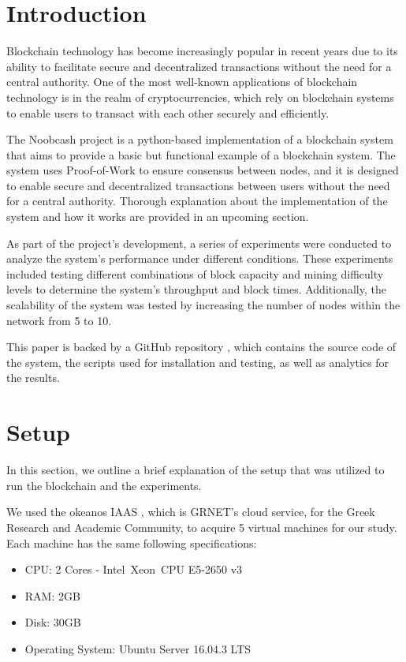 \documentclass[conference]{IEEEtran}
\begin{document}
\section{\textbf{Introduction}}
Blockchain technology has become increasingly popular in recent years due to its ability to facilitate secure and decentralized transactions without the need for a central authority. One of the most well-known applications of blockchain technology is in the realm of cryptocurrencies, which rely on blockchain systems to enable users to transact with each other securely and efficiently. 

The Noobcash project is a python-based implementation of a blockchain system that aims to provide a basic but functional example of a blockchain system. The system uses Proof-of-Work to ensure consensus between nodes, and it is designed to enable secure and decentralized transactions between users without the need for a central authority. Thorough explanation about the implementation of the system and how it works are provided in an upcoming section.

As part of the project's development, a series of experiments were conducted to analyze the system's performance under different conditions. These experiments included testing different combinations of block capacity and mining difficulty levels to determine the system's throughput and block times. Additionally, the scalability of the system was tested by increasing the number of nodes within the network from 5 to 10.

This paper is backed by a GitHub repository \cite{b5} \cite{b6}, which contains the source code of the system, the scripts used for installation and testing, as well as analytics for the results.

\section{\textbf{Setup}}
In this section, we outline a brief explanation of the setup that was utilized to run the blockchain and the experiments.

We used the okeanos IAAS \cite{b1}, which is GRNET's cloud service, for the Greek Research and Academic Community, to acquire 5 virtual machines for our study. Each machine has the same following specifications:

\begin{itemize}
\item CPU: 2 Cores - Intel\textregistered\ Xeon\textregistered\ CPU E5-2650 v3
\item RAM: 2GB
\item Disk: 30GB
\item Operating System: Ubuntu Server 16.04.3 LTS
\end{itemize}
\end{document}
